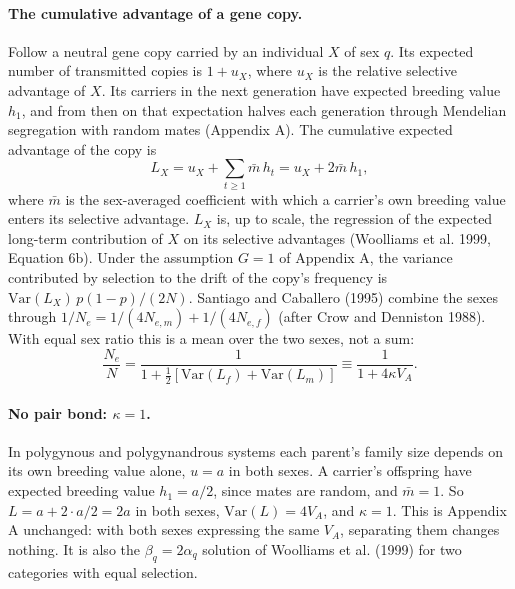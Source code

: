 \documentclass[12pt]{article}
\begin{document}
\paragraph{The cumulative advantage of a gene copy.} Follow a neutral gene copy carried by an individual $X$ of sex $q$. Its expected number of transmitted copies is $1 + u_X$, where $u_X$ is the relative selective advantage of $X$. Its carriers in the next generation have expected breeding value $h_1$, and from then on that expectation halves each generation through Mendelian segregation with random mates (Appendix A). The cumulative expected advantage of the copy is
\begin{equation}
    L_X = u_X + \sum_{t \ge 1} \bar{m}\, h_t = u_X + 2\bar{m}\, h_1,
\end{equation}
where $\bar{m}$ is the sex-averaged coefficient with which a carrier's own breeding value enters its selective advantage. $L_X$ is, up to scale, the regression of the expected long-term contribution of $X$ on its selective advantages (Woolliams et al. 1999, Equation 6b). Under the assumption $G = 1$ of Appendix A, the variance contributed by selection to the drift of the copy's frequency is $\mathrm{Var}(L_X)\,p(1-p)/(2N)$. Santiago and Caballero (1995) combine the sexes through $1/N_e = 1/(4N_{e,m}) + 1/(4N_{e,f})$ (after Crow and Denniston 1988). With equal sex ratio this is a mean over the two sexes, not a sum:
\begin{equation}
    \frac{N_e}{N} = \frac{1}{1 + \tfrac{1}{2}\left[\mathrm{Var}(L_f) + \mathrm{Var}(L_m)\right]} \equiv \frac{1}{1 + 4\kappa V_A}. \label{eq:kappa_def}
\end{equation}

\paragraph{No pair bond: $\kappa = 1$.} In polygynous and polygynandrous systems each parent's family size depends on its own breeding value alone, $u = a$ in both sexes. A carrier's offspring have expected breeding value $h_1 = a/2$, since mates are random, and $\bar{m} = 1$. So $L = a + 2 \cdot a/2 = 2a$ in both sexes, $\mathrm{Var}(L) = 4V_A$, and $\kappa = 1$. This is Appendix A unchanged: with both sexes expressing the same $V_A$, separating them changes nothing. It is also the $\beta_q = 2\alpha_q$ solution of Woolliams et al. (1999) for two categories with equal selection.
\end{document}
